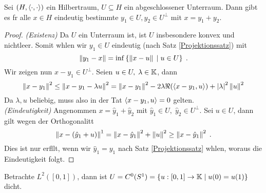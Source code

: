 	\begin{theorem}
		Sei \((H, \left\langle\cdot, \cdot\right\rangle)\) ein Hilbertraum, \(U\subseteq H\) ein abgeschlossener Unterraum.  Dann gibt es f\us r alle \(x\in H\) eindeutig bestimmte \(y_1 \in U, y_2 \in U^\perp\) mit \(x = y_1 + y_2\).
	\end{theorem}
	\begin{proof}
		\textit{(Existenz)} Da \(U\) ein Unterraum ist, ist $U$ insbesondere konvex und nichtleer. Somit w\as hlen wir \(y_1 \in U\) eindeutig (nach Satz \ref{Projektionssatz}) mit
		\[\left\lVert y_1 -x\right\rVert = \inf\left\{\left\lVert x-u\right\rVert\;\vert\; u \in U\right\}\;.\]
		Wir zeigen nun \(x-y_1 \in U^\perp\). Seien \(u\in U,\; \lambda \in \mathbb{K}\), dann 
		\[\left\lVert x-y_1\right\rVert^2 \leq \left\lVert x-y_1 -\lambda u\right\rVert^2 = \left\lVert x-y_1\right\rVert^2 -2 \lambda\Re(\left\langle x-y_1, u\right\rangle) + \left\lvert \lambda \right\rvert^2 \left\lVert u\right\rVert^2\]
		Da \(\lambda, u\) beliebig, muss also in der Tat \(\left\langle x-y_1,u\right\rangle = 0\) gelten.\\
		\textit{(Eindeutigkeit)} Angenommen \(x = \hat y_1 + \hat y_2\) mit \(\hat y_1 \in U,\; \hat y_2 \in U^\perp\). Sei \(u \in U\), dann gilt wegen der Orthogonalit\as t
		\[\left\lVert x-(\hat y_1 +u)\right\rVert^1 = \left\lVert x-\hat y_1\right\rVert^2 + \left\lVert u\right\rVert^2 \geq \left\lVert x-\hat y_1\right\rVert^2\;.\]
		Dies ist nur erf\us llt, wenn wir \(\hat y_1 = y_1\) nach Satz  \ref{Projektionssatz} w\as hlen, woraus die Eindeutigkeit folgt. 
	\end{proof}
	
	\begin{ex}
		Betrachte \(L^2([0,1])\), dann ist \(U = C^0(S^1) = \left\{u:[0,1]\to \mathbb{K}\;\vert\; u(0) = u(1)\right\}\) dicht.
	\end{ex}

